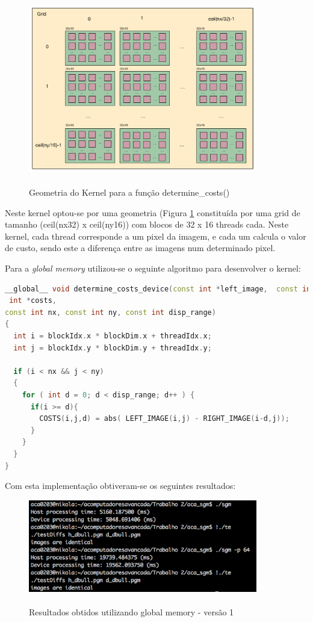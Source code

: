 \documentclass[pdftex,12pt,a4paper]{report}
\begin{document}
\begin{figure}[!htb]
\center
 \includegraphics[width=100mm,scale=1]{DetermineCosts_v1_kernel.pdf}
 \caption{\\ Geometria do Kernel para a função determine\_costs()}
 \label{fig:DetermineCosts_v1_kernel}
\end{figure}

Neste kernel optou-se por uma geometria (Figura \ref{fig:DetermineCosts_v1_kernel}  constituída por uma grid de tamanho (ceil(nx\/32) x ceil(ny\/16)) com blocos de 32 x 16 threads cada.
Neste kernel, cada thread corresponde a um pixel da imagem, e cada um calcula o valor de custo, sendo este a diferença entre as imagens num determinado pixel.

Para a \textit{global memory} utilizou-se o seguinte algoritmo para desenvolver o kernel:

\begin{lstlisting}[language=c++, basicstyle=\scriptsize]
__global__ void determine_costs_device(const int *left_image,  const int *right_image,
 int *costs, 
const int nx, const int ny, const int disp_range)
{
  int i = blockIdx.x * blockDim.x + threadIdx.x;
  int j = blockIdx.y * blockDim.y + threadIdx.y;

  if (i < nx && j < ny)
  {
    for ( int d = 0; d < disp_range; d++ ) {
      if(i >= d){
        COSTS(i,j,d) = abs( LEFT_IMAGE(i,j) - RIGHT_IMAGE(i-d,j));
      }
    }
  }
}
\end{lstlisting} 

Com esta implementação obtiveram-se os seguintes resultados:

\begin{figure}[!htb]
\center
 \includegraphics[width=100mm,scale=1]{DetermineCostsv1globalresults.png}
 \caption{\\ Resultados obtidos utilizando global memory - versão 1}
 \label{fig:DetermineCostsv1globalresults}
\end{figure}
\end{document}
